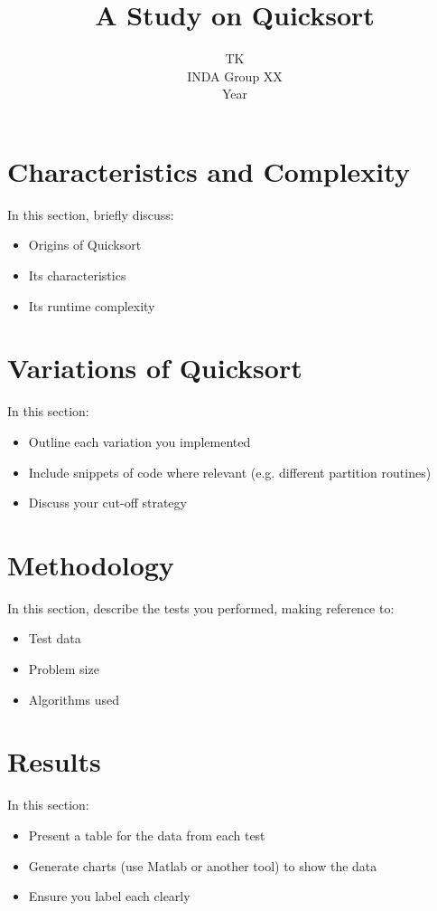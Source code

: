\documentclass[a4paper,10pt]{article}
\title{\Huge A Study on Quicksort}
\author{TK\\INDA Group XX\\Year}       %
\date{}
\begin{document}
\section{Characteristics and Complexity} %
\label{sec:characteristics_and_complexity}

In this section, briefly discuss:
\begin{itemize}
	\item Origins of Quicksort
	\item Its characteristics
	\item Its runtime complexity
\end{itemize}


\section{Variations of Quicksort} %
\label{sec:variations_of_quicksort}

In this section:
\begin{itemize}
	\item Outline each variation you implemented
	\item Include snippets of code where relevant (e.g. different partition routines)
	\item Discuss your cut-off strategy
\end{itemize}


\section{Methodology} %
\label{sec:methodology}

In this section, describe the tests you performed, making reference to:
\begin{itemize}
	\item Test data
	\item Problem size
	\item Algorithms used
\end{itemize}


\section{Results} %
\label{sec:results}

In this section:
\begin{itemize}
	\item Present a table for the data from each test
	\item Generate charts (use Matlab or another tool) to show the data
	\item Ensure you label each clearly
\end{itemize}
\end{document}
